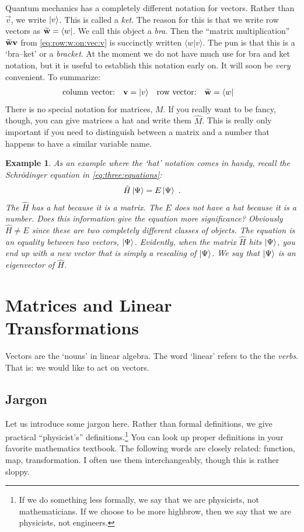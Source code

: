 \documentclass[12pt]{article}
\newtheorem{example}{Example}[section]
\begin{document}
Quantum mechanics has a completely different notation for vectors. Rather than $\vec{v}$, we write $\left|v\right\rangle$. This is called a \emph{ket}. The reason for this is that we write row vectors as $\widetilde{\mathbf{w}} = \left\langle w\right|$. We call this object a \emph{bra}. Then the ``matrix multiplication'' $\widetilde{\mathbf{w}}\mathbf{v}$ from \eqref{eq:row:w:on:vec:v} is succinctly written $\langle w|v\rangle$. The pun is that this is a `bra--ket' or a \emph{bracket}. At the moment we do not have much use for bra and ket notation, but it is useful to establish this notation early on. It will soon be \emph{very} convenient. To summarize:
\begin{align}
    \textnormal{column vector:}\quad \mathbf{v} &= \left|v\right\rangle
    &
    \textnormal{row vector:}\quad \widetilde{\mathbf{w}} &= \left\langle w\right|
\end{align}
There is no special notation for matrices, $M$. If you really want to be fancy, though, you can give matrices a hat and write them $\hat M$. This is really only important if you need to distinguish between a matrix and a number that happens to have a similar variable name. 

\begin{example}
As an example where the `hat' notation comes in handy, recall the Schr\"odinger equation in \eqref{eq:three:equations}:
\begin{align}
    \hat H \left|\Psi\right\rangle = E \left|\Psi\right\rangle \ .
\end{align}
The $\hat H$ has a hat because it is a matrix. The $E$ does not have a hat because it is a number. Does this information give the equation more significance? Obviously $\hat H \neq E$ since these are two completely different classes of objects. The equation is an equality between two vectors, $\left|\Psi\right\rangle$. Evidently, when the matrix $\hat H$ hits $\left|\Psi\right\rangle$, you end up with a new vector that is simply a rescaling of $\left|\Psi\right\rangle$. We say that $\left|\Psi\right\rangle$ is an \emph{eigenvector} of $\hat H$. 
\end{example}



\section{Matrices and Linear Transformations}

Vectors are the `nouns' in linear algebra. The word `linear' refers to the the \emph{verbs}. That is: we would like to act on vectors. 


\subsection{Jargon}
Let us introduce some jargon here. Rather than formal definitions, we give practical ``physicist's'' definitions.\footnote{If we do something less formally, we say that we are physicists, not mathematicians. If we choose to be more highbrow, then we say that we are physicists, not engineers.} You can look up proper definitions in your favorite mathematics textbook.  The following words are closely related: function, map, transformation. I often use them interchangeably, though this is rather sloppy.  
\end{document}
